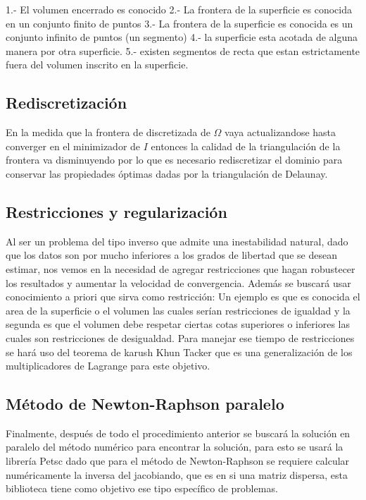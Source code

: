 1.- El volumen encerrado es conocido
2.- La frontera de la superficie es conocida en un conjunto finito de puntos
3.- La frontera de la superficie es conocida es un conjunto infinito de puntos (un segmento)
4.- la superficie esta acotada de alguna manera por otra superficie.
5.- existen segmentos de recta que estan estrictamente fuera del volumen inscrito en la superficie.



\subsection{Rediscretización}
En la medida que la frontera de discretizada de $\Omega$ vaya
actualizandose hasta converger en el minimizador de $I$ entonces la
calidad de la triangulación de la frontera va disminuyendo por lo que
es necesario rediscretizar el dominio para conservar las propiedades
óptimas dadas por la triangulación de Delaunay.

\subsection{Restricciones y regularización}
Al ser un problema del tipo inverso que admite una inestabilidad
natural, dado que los datos son por mucho inferiores a los grados de
libertad que se desean estimar, nos vemos en la necesidad de agregar
restricciones que hagan robustecer los resultados y aumentar la
velocidad de convergencia. Además se buscará usar conocimiento a
priori que sirva como restricción: Un ejemplo es que es conocida el
area de la superficie o el volumen las cuales serían restricciones de
igualdad y la segunda es que el volumen debe respetar ciertas cotas
superiores o inferiores las cuales son  restricciones de
desigualdad. Para manejar ese tiempo de restricciones se hará uso del
teorema de karush Khun Tacker que es una generalización de los
multiplicadores de Lagrange para este objetivo.

\subsection{Método de Newton-Raphson paralelo}
Finalmente, después de todo el procedimiento anterior se buscará la
solución en paralelo del método numérico para encontrar la solución,
para esto se usará la librería Petsc dado que para el método de
Newton-Raphson se requiere calcular numéricamente la inversa del
jacobiando, que es en si una matriz dispersa, esta biblioteca tiene
como objetivo ese tipo específico de problemas.

